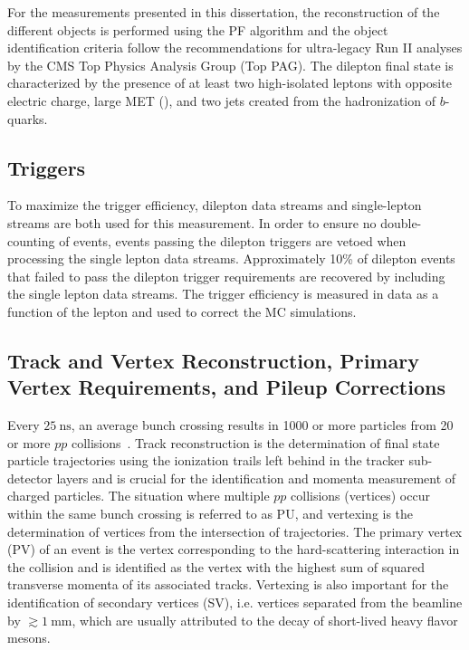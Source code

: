 For the measurements presented in this dissertation, the reconstruction of the different objects is performed using the PF algorithm and the object identification criteria follow the recommendations for ultra-legacy Run II analyses by the CMS Top Physics Analysis Group (Top PAG).
The \ttbar dilepton final state is characterized by the presence of at least two high-\pT isolated leptons with opposite electric charge, large MET (\ETmiss), and two jets created from the hadronization of $b$-quarks.

\subsection{Triggers}
To maximize the trigger efficiency, dilepton data streams and single-lepton streams are both used for this measurement.
In order to ensure no double-counting of events, events passing the dilepton triggers are vetoed when processing the single lepton data streams.
Approximately 10\% of dilepton events that failed to pass the dilepton trigger requirements are recovered by including the single lepton data streams.
The trigger efficiency is measured in data as a function of the lepton \pT and used to correct the MC simulations.

\subsection{Track and Vertex Reconstruction, Primary Vertex Requirements, and Pileup Corrections}
Every $\SI{25}{\ns}$, an average bunch crossing results in 1000 or more particles from 20 or more $pp$ collisions~\cite{Chatrchyan:1129810}.
Track reconstruction is the determination of final state particle trajectories using the ionization trails left behind in the tracker sub-detector layers and is crucial for the identification and momenta measurement of charged particles.
The situation where multiple $pp$ collisions (vertices) occur within the same bunch crossing is referred to as PU, and vertexing is the determination of vertices from the intersection of trajectories.
The primary vertex (PV) of an event is the vertex corresponding to the hard-scattering interaction in the collision and is identified as the vertex with the highest sum of squared transverse momenta of its associated tracks.
Vertexing is also important for the identification of secondary vertices (SV), i.e. vertices separated from the beamline by $\gtrsim \SI{1}{\mm}$, which are usually attributed to the decay of short-lived heavy flavor mesons.

